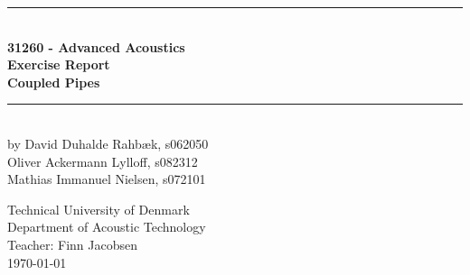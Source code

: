 \begin{titlepage}
\centering \parindent=0pt
\newcommand{\HRule}{\rule{\textwidth}{1mm}}
 \HRule\\[1cm]\Huge\bfseries
31260 - Advanced Acoustics\\Exercise Report\\[0.7cm]
\large Coupled Pipes\\[1cm]
\HRule\\[4cm]  \large by David Duhalde Rahbæk, s062050\\
Oliver Ackermann Lylloff, s082312\\
Mathias Immanuel Nielsen, s072101\\
 \normalsize %
\begin{flushleft}
Technical University of Denmark\\
Department of Acoustic Technology\\
Teacher: Finn Jacobsen\\
\today \end{flushleft}
\end{titlepage}
